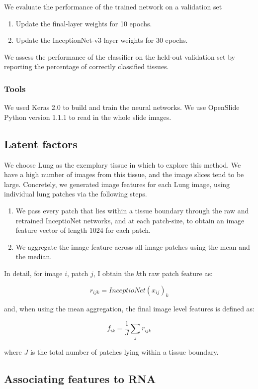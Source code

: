 \documentclass[graybox]{svmult}
\begin{document}
We evaluate the performance of the trained network on a validation set
\begin{enumerate}
 \item Update the final-layer weights for 10 epochs.
 \item Update the InceptionNet-v3 layer weights for 30 epochs.
\end{enumerate}

We assess the performance of the classifier on the held-out validation set by reporting the percentage of correctly classified tissues.

\subsubsection{Tools}
We used Keras 2.0 \cite{keras} to build and train the neural networks. We use OpenSlide Python \cite{openslide}  version 1.1.1 to read in the whole slide images.

\subsection{Latent factors}

We choose Lung as the exemplary tissue in which to explore this method. We have a high number of images from this tissue, and the image slices tend to be large. Concretely, we generated image features for each Lung image, using individual lung patches via the following steps.

\begin{enumerate}
\item We pass every patch that lies within a tissue boundary through the raw and retrained InceptioNet networks, and at each patch-size, to obtain an image feature vector of length $1024$ for each patch.
 \item We aggregate the image feature across all image patches using the mean and the median.
\end{enumerate}
In detail, for image $i$, patch $j$, I obtain the $k$th raw patch feature as:

$$r_{ijk} =  InceptioNet(x_{ij})_k$$

and, when using the mean aggregation, the final image level features is defined as:

$$f_{ik} = \frac{1}{J}\sum_j r_{ijk}$$

where $J$ is the total number of patches lying within a tissue boundary.

\subsection{Associating features to RNA}
\end{document}
